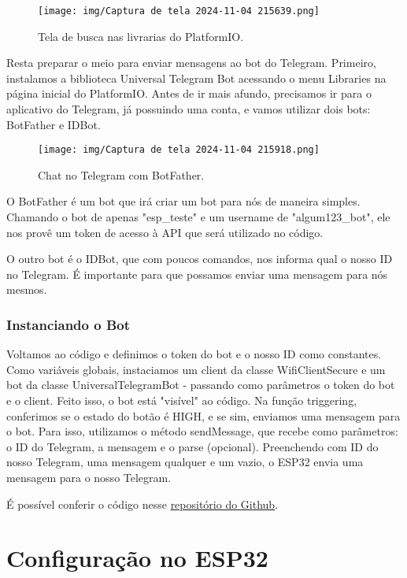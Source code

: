 \documentclass[12pt]{article}
\begin{document}
\begin{figure}[H]
    \centering
    \texttt{[image: img/Captura de tela 2024-11-04 215639.png]}
    \caption{Tela de busca nas livrarias do PlatformIO.}
    \label{fig:platformIO-libraries}
\end{figure}

Resta preparar o meio para enviar mensagens ao bot do Telegram. Primeiro, instalamos a biblioteca Universal Telegram Bot acessando o menu Libraries na página inicial do PlatformIO. Antes de ir mais afundo, precisamos ir para o aplicativo do Telegram, já possuindo uma conta, e vamos utilizar dois bots: BotFather e IDBot.

\begin{figure}[H]
    \centering
    \texttt{[image: img/Captura de tela 2024-11-04 215918.png]}
    \caption{Chat no Telegram com BotFather.}
    \label{fig:botfather}
\end{figure}

O BotFather é um bot que irá criar um bot para nós de maneira simples. Chamando o bot de apenas "esp\_teste" e um username de "algum123\_bot", ele nos provê um token de acesso à API que será utilizado no código.

O outro bot é o IDBot, que com poucos comandos, nos informa qual o nosso ID no Telegram. É importante para que possamos enviar uma mensagem para nós mesmos.

\subsubsection{Instanciando o Bot}

Voltamos ao código e definimos o token do bot e o nosso ID como constantes. Como variáveis globais, instaciamos um client da classe WifiClientSecure e um bot da classe UniversalTelegramBot - passando como parâmetros o token do bot e o client. Feito isso, o bot está "visível" ao código. Na função triggering, conferimos se o estado do botão é HIGH, e se sim, enviamos uma mensagem para o bot. Para isso, utilizamos o método sendMessage, que recebe como parâmetros: o ID do Telegram, a mensagem e o parse (opcional). Preenchendo com ID do nosso Telegram, uma mensagem qualquer e um vazio, o ESP32 envia uma mensagem para o nosso Telegram.

É possível conferir o código nesse \href{https://github.com/fabricio-araujo94/microcontroladores/tree/main/acionamento_telegram}{repositório do Github}.

\section{Configuração no ESP32}\label{sec:configuração-no-esp32}
\end{document}
